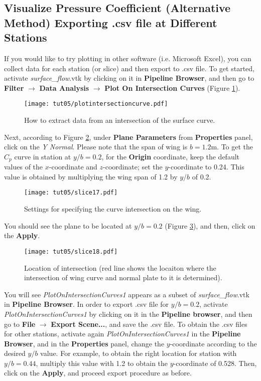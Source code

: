 \subsection{Visualize Pressure Coefficient (Alternative Method) Exporting .csv file at Different Stations}
If you would like to try plotting in other software (i.e. Microsoft Excel), you can collect data for each station (or slice) and then export to .csv file. To get started, activate \textit{surface\_flow}.vtk by clicking on it in \textbf{Pipeline Browser}, and then go to \textbf{Filter} $\rightarrow$ \textbf{Data Analysis} $\rightarrow$ \textbf{Plot On Intersection Curves} (Figure \ref{fig5:plotinintersectioncurve5}).
\begin{figure}[htbp]
    \centering
    \texttt{[image: tut05/plotintersectioncurve.pdf]}
    \caption{How to extract data from an intersection of the surface curve. }
    \label{fig5:plotinintersectioncurve5}
\end{figure}
Next, according to Figure \ref{fig5:slice17}, under \textbf{Plane Parameters} from \textbf{Properties} panel, click on the \textit{Y Normal}. Please note that the span of wing is $b=1.2$m. To get the $C_p$ curve in station at $y/b=0.2$, for the \textbf{Origin} coordinate, keep the default values of the $x$-coordinate and $z$-coordinate; set the $y$-coordinate to 0.24. This value is obtained by multiplying the wing span of 1.2 by $y/b$ of 0.2.
\begin{figure}[htbp]
    \centering
    \texttt{[image: tut05/slice17.pdf]}
    \caption{Settings for specifying the curve intersection on the wing.}
    \label{fig5:slice17}
\end{figure}
You should see the plane to be located at $y/b = 0.2$ (Figure \ref{fig5:slice18}), and then, click on the \textbf{Apply}.
\begin{figure}[htbp]
    \centering
    \texttt{[image: tut05/slice18.pdf]}
    \caption{Location of intersection (red line shows the locaiton where the intersection of wing curve and normal plate to it is determined).}
    \label{fig5:slice18}
\end{figure}
You will see \textit{PlotOnIntersectionCurves1} appears as a subset of \textit{surface\_flow}.vtk in \textbf{Pipeline Browser}. In order to export .csv file for $y/b=0.2$, activate \textit{PlotOnIntersectionCurves1} by clicking on it in the \textbf{Pipeline browser}, and then go to \textbf{File} $\rightarrow$ \textbf{Export Scene...}, and save the .csv file. To obtain the .csv files for other stations, activate again \textit{PlotOnIntersectionCurves1} in the \textbf{Pipeline Browser}, and in the \textbf{Properties} panel, change the $y$-coordinate according to the desired $y/b$ value. For example, to obtain the right location for station with $y/b=0.44$, multiply this value with 1.2 to obtain the $y$-coordinate of 0.528. Then, click on the \textbf{Apply}, and proceed export procedure as before.

